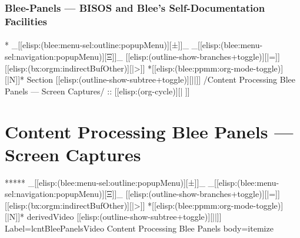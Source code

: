 \begin{whenOrg}
\begin{verblatex}

\begin{frame}[fragile,label=part_bleePanels]
    \frametitle{Blee-Panels --- BISOS and Blee's Self-Documentation Facilities}
    \framesubtitle{}

    \tableofcontents

\end{frame}
\end{verblatex}


\begin{whenOrg}
*  _[[elisp:(blee:menu-sel:outline:popupMenu)][±]]_ _[[elisp:(blee:menu-sel:navigation:popupMenu)][Ξ]]_ [[elisp:(outline-show-branches+toggle)][|=]] [[elisp:(bx:orgm:indirectBufOther)][|>]] *[[elisp:(blee:ppmm:org-mode-toggle)][|N]]*  Section    [[elisp:(outline-show-subtree+toggle)][||]]   /Content Processing Blee Panels --- Screen Captures/ ::  [[elisp:(org-cycle)][| ]]
\end{whenOrg}

\section{Content Processing Blee Panels --- Screen Captures}

\begin{whenOrg}
*****  _[[elisp:(blee:menu-sel:outline:popupMenu)][±]]_ _[[elisp:(blee:menu-sel:navigation:popupMenu)][Ξ]]_ [[elisp:(outline-show-branches+toggle)][|=]] [[elisp:(bx:orgm:indirectBufOther)][|>]] *[[elisp:(blee:ppmm:org-mode-toggle)][|N]]*  derivedVideo [[elisp:(outline-show-subtree+toggle)][||]] Label=lcntBleePanelsVideo Content Processing Blee Panels body=itemize
\end{whenOrg}


\end{whenOrg}

